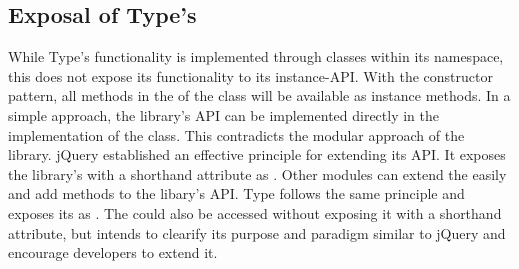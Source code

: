 \subsection{Exposal of Type's }
\label{subsec_fn_exposal}

While Type's functionality is implemented through classes within its namespace, this does not expose its functionality to its instance-API. With the constructor pattern, all methods in the  of the  class will be available as instance methods. In a simple approach, the library's API can be implemented directly in the implementation of the  class. This contradicts the modular approach of the library. jQuery established an effective principle for extending its API. It exposes the library's  with a shorthand attribute as . Other modules can extend the  easily and add methods to the libary's API. Type follows the same principle and exposes its   as . The  could also be accessed without exposing it with a shorthand attribute, but intends to clearify its purpose and paradigm similar to jQuery and encourage developers to extend it.






